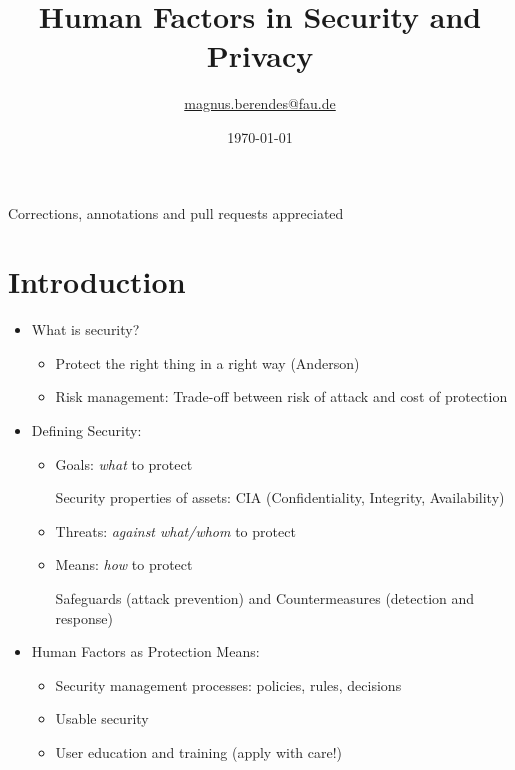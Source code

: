 \documentclass[a4paper]{scrartcl}
\title{Human Factors in Security and Privacy}
\author{\href{mailto:magnus.berendes@fau.de}{magnus.berendes@fau.de}}
\date{\today}
\begin{document}
\maketitle

\vfill
\begin{centering}
	Corrections, annotations and pull requests appreciated
	\\
\end{centering}


\newpage

\tableofcontents
\newpage
\printindex
\printbibliography
\newpage

\section{Introduction}
\begin{itemize}
	\item
		What is security?
		\begin{itemize}
			\item
				Protect the right thing in a right way (Anderson)
			\item
				Risk management: Trade-off between risk of attack and cost of protection
		\end{itemize}
	\item
		Defining Security:
		\begin{itemize}
			\item
				Goals: \textit{what} to protect

				Security properties of assets: CIA (Confidentiality, Integrity, Availability)
			\item
				Threats: \textit{against what/whom} to protect
			\item
				Means: \textit{how} to protect

				Safeguards (attack prevention) and Countermeasures (detection and response)
		\end{itemize}
	\item
		Human Factors as Protection Means:
		\begin{itemize}
			\item
				Security management processes: policies, rules, decisions
			\item
				Usable security
			\item
				User education and training (apply with care!)
		\end{itemize}


\end{itemize}
\end{document}
